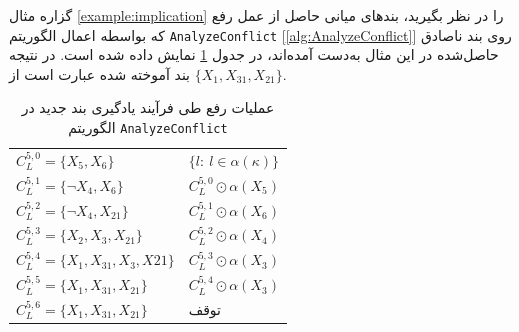 \begin{example}
گزاره مثال 
\ref{example:implication}
را در نظر بگیرید،  بندهای میانی  حاصل از عمل رفع که بواسطه اعمال الگوریتم 
\texttt{AnalyzeConflict}
[\ref{alg:AnalyzeConflict}]
روی  بند ناصادق  حاصل‌شده در این مثال  به‌دست آمده‌اند، در جدول 
\ref{tab:ResolutionSteps1}
نمایش داده شده‌ است. 
در نتیجه بند آموخته شده عبارت است از 
$ \{X_{1}, X_{31}, X_{21}\}$. 
\end{example}
\begin{table}
\begin{center}
	\begin{tabular}{ll}
		\hline 
		$C_{L}^{5, 0} = \{X_{5}, X_{6}\}$ &$ \{l:\ l \in \alpha(\kappa)\}$\\
		$C_{L}^{5, 1} = \{\neg X_{4}, X_{6}\}$& $C_{L}^{5, 0} \odot \alpha(X_{5})$\\
		$C_{L}^{5, 2} = \{\neg X_{4}, X_{21}\}$& $C_{L}^{5, 1}\odot \alpha(X_{6})$\\
		$C_{L}^{5, 3} = \{X_{2}, X_{3}, X_{21}\}$& $C_{L}^{5, 2}\odot \alpha(X_{4})$\\
		$C_{L}^{5, 4} = \{X_{1}, X_{31}, X_{3}, X{21}\}$& $C_{L}^{5,3}\odot \alpha(X_{3})$\\
		$C_{L}^{5,5} = \{X_{1}, X_{31}, X_{21}\}$& $C_{L}^{5, 4}\odot \alpha(X_{3})$\\
		$C_{L}^{5,6} = \{X_{1}, X_{31}, X_{21}\}$& توقف\\
		\hline 
	\end{tabular} 
	\caption{عملیات رفع طی فرآیند یادگیری بند جدید در الگوریتم 
		\texttt{AnalyzeConflict}}
	\label{tab:ResolutionSteps1}
\end{center}
\end{table}

